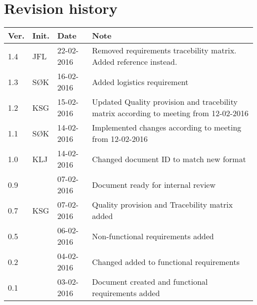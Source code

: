\label{chp_revisionHistory}
\chapter*{Revision history}

\begin{tabular}{b{1cm} b{1cm} b{2cm} b{8cm}}
    \textbf{Ver.} & \textbf{Init.} & \textbf{Date} & \textbf{Note} \\
    \hline
    1.4 & JFL & 22-02-2016 & Removed requirements tracebility matrix. Added reference instead. \\
    1.3 & SØK & 16-02-2016 & Added logistics requirement \\ 
    1.2 & KSG & 15-02-2016 & Updated Quality provision and tracebility matrix according to meeting from 12-02-2016 \\ 
    1.1 & SØK & 14-02-2016 & Implemented changes according to meeting from 12-02-2016 \\ 
    1.0 & KLJ & 14-02-2016 & Changed document ID to match new format \\
    0.9 & & 07-02-2016 & Document ready for internal review \\
    0.7 & KSG & 07-02-2016 & Quality provision and Tracebility matrix added \\
    0.5 & & 06-02-2016 & Non-functional requirements added \\
    0.2 & & 04-02-2016 & Changed added to functional requirements \\
    0.1 & & 03-02-2016 & Document created and functional requirements added  \\
\end{tabular}